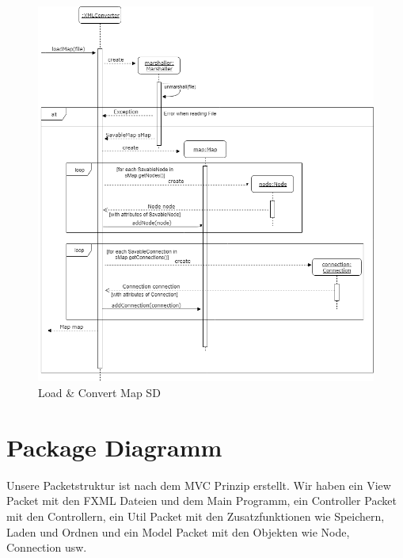 \begin{figure}[H]
	\centering
		\includegraphics[width=\textwidth]{images/loadConvertSD.png}
	\caption{Load \& Convert Map SD}
	\label{fig:loadConvert_SD}
\end{figure}

\section{Package Diagramm}
\label{sec:package_diagramm}
Unsere Packetstruktur ist nach dem MVC Prinzip erstellt. Wir haben ein View Packet mit den FXML Dateien und dem Main Programm, ein Controller Packet mit den Controllern, ein Util Packet mit den Zusatzfunktionen wie Speichern, Laden und Ordnen und ein Model Packet mit den Objekten wie Node, Connection usw.

